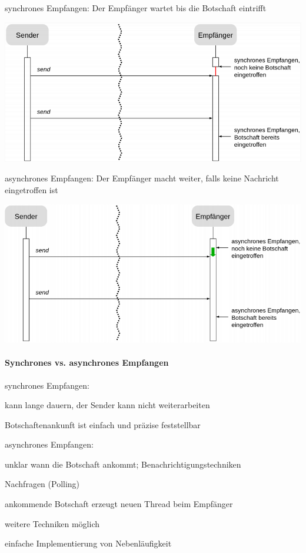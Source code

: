 \documentclass[10pt]{article}
\begin{document}
\color{orange} synchrones Empfangen: \color{black} Der Empfänger wartet bis die Botschaft eintrifft
\begin{center}
  \includegraphics[width=0.4\linewidth]{Assets/Programmierparadigmen-synchron-empfangen}
\end{center}
\color{orange} asynchrones Empfangen: \color{black} Der Empfänger macht weiter, falls keine Nachricht eingetroffen ist
\begin{center}
  \includegraphics[width=0.4\linewidth]{Assets/Programmierparadigmen-asynchron-empfangen}
\end{center}

\paragraph{Synchrones vs. asynchrones Empfangen}
\begin{itemize*}
  \item synchrones Empfangen:
  \begin{itemize*}
    \item kann lange dauern, der Sender kann nicht weiterarbeiten
    \item Botschaftenankunft ist einfach und präzise feststellbar
  \end{itemize*}
  \item asynchrones Empfangen:
  \begin{itemize*}
    \item unklar wann die Botschaft ankommt;
    \newline Benachrichtigungstechniken 
    \begin{itemize*}
      \item Nachfragen (Polling)
      \item ankommende Botschaft erzeugt neuen Thread beim Empfänger
      \item weitere Techniken möglich
    \end{itemize*}
    \item einfache Implementierung von Nebenläufigkeit
  \end{itemize*}
\end{itemize*}
\end{document}
